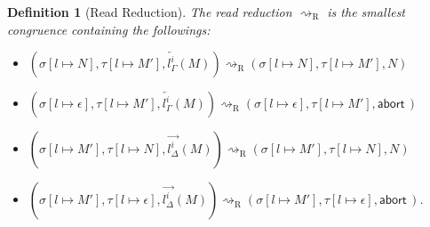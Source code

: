 \documentclass[doctor]{iscs-thesis}
\newtheorem{definition}{Definition}
\newcommand{\reduce}{\rightsquigarrow}
\newcommand{\ltor}[4]{\overrightarrow{{#2}^{#1}_{#3}} \left({#4}\right)}
\newcommand{\rtol}[4]{\overleftarrow{{#2}^{#1}_{#3}} \left({#4}\right)}
\newcommand{\abort}{\mathsf{abort\,}}
\newcommand{\lstore}{{\sigma}}
\newcommand{\rstore}{{\tau}}
\newcommand{\conf}[3]{(\lstore{#1},\rstore{#2},{#3})}
\newcommand{\rreduce}{\reduce_{\mathrm R}}
\begin{document}
\begin{definition}[Read Reduction]
 \label{read}
 The read reduction $\rreduce$ is the smallest congruence
 containing the
 followings:
\begin{itemize}
 \item  $\conf{[l\mapsto {N}]}{[l\mapsto M']}{\rtol i l\Gamma M}\rreduce
	\conf{[l\mapsto {N}]}{[l\mapsto M']}{N}$
 \item  $\conf{[l\mapsto \epsilon]}
	{[l\mapsto M']}{\rtol i l\Gamma M}\rreduce
	\conf{[l\mapsto \epsilon]}{[l\mapsto M']}{\abort}$
 \item  $\conf{[l\mapsto M']}{[l\mapsto {N}]}{\ltor i l \Delta M}\rreduce
	\conf{[l\mapsto M']}{[l\mapsto {N}]}{N}$
 \item  $\conf{[l\mapsto M']}{[l\mapsto \epsilon]}{\ltor i l \Delta M}\rreduce
	 \conf{[l\mapsto M']}{[l\mapsto \epsilon]}{\abort}$\enspace .
\end{itemize}
\end{definition}
\end{document}
